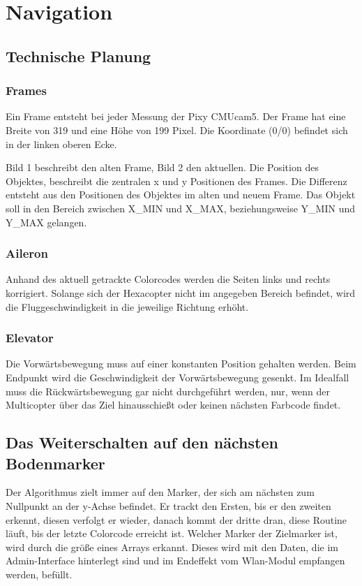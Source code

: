 
\section{Navigation}

  \subsection{Technische Planung}

    \subsubsection{Frames}

    Ein Frame entsteht bei jeder Messung der Pixy CMUcam5. Der Frame hat eine Breite von 319 und eine Höhe von 199 Pixel. Die Koordinate (0/0) befindet sich in der linken oberen Ecke.

    Bild 1 beschreibt den alten Frame, Bild 2 den aktuellen. Die Position des Objektes, beschreibt die zentralen x und y Positionen des Frames. Die Differenz entsteht aus den Positionen des Objektes im alten und neuem Frame. Das Objekt soll in den Bereich zwischen X\_MIN und X\_MAX, beziehungsweise Y\_MIN und Y\_MAX gelangen.


    \subsubsection{Aileron}
    Anhand des aktuell getrackte Colorcodes werden die Seiten links und rechts korrigiert. Solange sich der Hexacopter nicht im angegeben Bereich befindet, wird die Fluggeschwindigkeit in die jeweilige Richtung erhöht.

    \subsubsection{Elevator}
    Die Vorwärtsbewegung muss auf einer konstanten Position gehalten werden. Beim Endpunkt wird die Geschwindigkeit der Vorwärtsbewegung gesenkt. Im Idealfall muss die Rückwärtsbewegung gar nicht durchgeführt werden, nur, wenn der Multicopter über das Ziel hinausschießt oder keinen nächsten Farbcode findet.

    \subsection*{Das Weiterschalten auf den nächsten Bodenmarker}
    Der Algorithmus zielt immer auf den Marker, der sich am nächsten zum Nullpunkt an der y-Achse befindet. Er trackt den Ersten, bis er den zweiten erkennt, diesen verfolgt er wieder, danach kommt der dritte dran, diese Routine läuft, bis der letzte Colorcode erreicht ist. Welcher Marker der Zielmarker ist, wird durch die größe eines Arrays erkannt. Dieses wird mit den Daten, die im Admin-Interface hinterlegt sind und im Endeffekt vom Wlan-Modul empfangen werden, befüllt.

